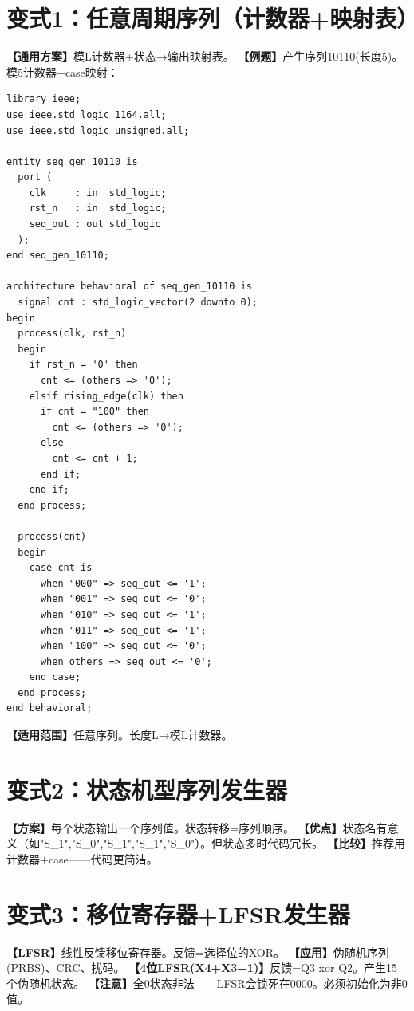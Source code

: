 \section{变式1：任意周期序列（计数器+映射表）}

\begin{detailbox}[完整教学]
\textbf{【通用方案】}模L计数器+状态→输出映射表。
\textbf{【例题】}产生序列10110(长度5)。模5计数器+case映射：
\begin{lstlisting}
library ieee;
use ieee.std_logic_1164.all;
use ieee.std_logic_unsigned.all;

entity seq_gen_10110 is
  port (
    clk     : in  std_logic;
    rst_n   : in  std_logic;
    seq_out : out std_logic
  );
end seq_gen_10110;

architecture behavioral of seq_gen_10110 is
  signal cnt : std_logic_vector(2 downto 0);
begin
  process(clk, rst_n)
  begin
    if rst_n = '0' then
      cnt <= (others => '0');
    elsif rising_edge(clk) then
      if cnt = "100" then
        cnt <= (others => '0');
      else
        cnt <= cnt + 1;
      end if;
    end if;
  end process;

  process(cnt)
  begin
    case cnt is
      when "000" => seq_out <= '1';
      when "001" => seq_out <= '0';
      when "010" => seq_out <= '1';
      when "011" => seq_out <= '1';
      when "100" => seq_out <= '0';
      when others => seq_out <= '0';
    end case;
  end process;
end behavioral;
\end{lstlisting}
\textbf{【适用范围】}任意序列。长度L→模L计数器。
\end{detailbox}


\section{变式2：状态机型序列发生器}

\begin{detailbox}[完整教学]
\textbf{【方案】}每个状态输出一个序列值。状态转移=序列顺序。
\textbf{【优点】}状态名有意义（如"S\_1","S\_0","S\_1","S\_1","S\_0"）。但状态多时代码冗长。
\textbf{【比较】}推荐用计数器+case——代码更简洁。
\end{detailbox}


\section{变式3：移位寄存器+LFSR发生器}

\begin{detailbox}[完整教学]
\textbf{【LFSR】}线性反馈移位寄存器。反馈=选择位的XOR。
\textbf{【应用】}伪随机序列(PRBS)、CRC、扰码。
\textbf{【4位LFSR(X4+X3+1)】}反馈=Q3 xor Q2。产生15个伪随机状态。
\textbf{【注意】}全0状态非法——LFSR会锁死在0000。必须初始化为非0值。
\end{detailbox}


